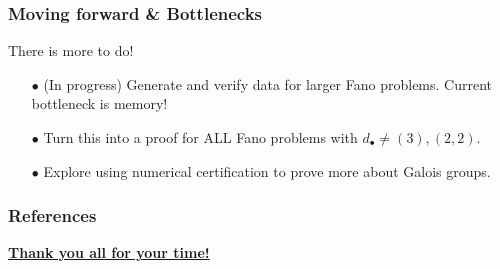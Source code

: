 \documentclass{beamer}
\theoremstyle{definition}
\begin{document}
%
\begin{frame}
\frametitle{Moving forward \& Bottlenecks}

There is more to do!
\begin{enumerate}
\item[$\bullet$] (In progress) Generate and verify data for larger Fano problems. Current bottleneck is memory!

\item[$\bullet$] Turn this into a proof for ALL Fano problems with $d_\bullet\ne(3),(2,2)$.

\item[$\bullet$] Explore using numerical certification to prove more about Galois groups.
\end{enumerate}
\end{frame}


\begin{frame}[allowframebreaks]
\frametitle{References}
\vspace{-.3cm}
\begin{center}
\textbf{\underline{Thank you all for your time!}}
\end{center}
\vspace{-.3cm}


\cite{HCJL,DM,Harris,HK,alphaCertified,Jordan}
\end{frame}
\end{document}
